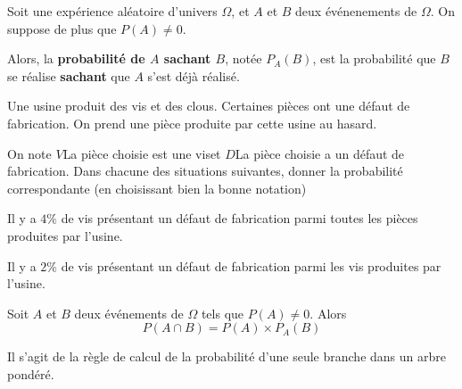 \documentclass{poly}
\begin{document}
\begin{definition}
Soit une expérience aléatoire d'univers $\Omega$, et $A$ et $B$ deux événenements de $\Omega$. On suppose de plus que $P(A) \neq 0$.

Alors, la \textbf{probabilité de $A$ sachant $B$}, notée $P_{A}(B)$, est la probabilité que $B$ se réalise \textbf{sachant} que $A$ s'est déjà réalisé.
\end{definition}

\begin{example}
Une usine produit des vis et des clous. Certaines pièces ont une défaut de fabrication. On prend une pièce produite par cette usine au hasard.

On note $V$\og La pièce choisie est une vis\fg et $D$\og La pièce choisie a un défaut de fabrication\fg. Dans chacune des situations suivantes, donner la probabilité correspondante (en choisissant bien la bonne notation)

\begin{alphaquestions}
\item Il y a $4\%$ de vis présentant un défaut de fabrication parmi toutes les pièces produites par l'usine.
\item Il y a $2\%$ de vis présentant un défaut de fabrication parmi les vis produites par l'usine.     
\end{alphaquestions}
\vspace*{0.5cm}

\end{example}

\begin{proposition}
Soit $A$ et $B$ deux événements de $\Omega$ tels que $P(A) \neq 0$. Alors 
\begin{equation*}
P(A \cap B) = P(A) \times P_A(B)
\end{equation*}
\end{proposition}

\begin{remark}
Il s'agit de la règle de calcul de la probabilité d'une seule branche dans un arbre pondéré.
\end{remark}
\end{document}
